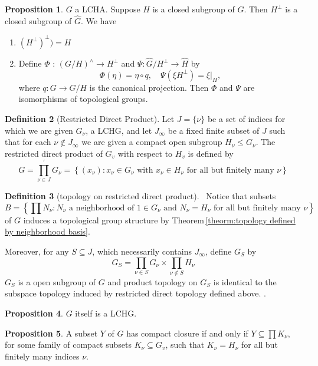 \documentclass[12pt,a4paper]{book}
\newenvironment{enu}{\begin{enumerate}[(1)]}{\end{enumerate}}
\theoremstyle{definition}
\newtheorem{defn}{Definition}[section]
\newtheorem{prop}[defn]{Proposition}
\begin{document}
\begin{prop}
    $G$ a LCHA. Suppose $H$ is a closed subgroup of $G$. Then $H^{\perp}$ is a closed subgroup of $\widehat{G}$. We have 
    \begin{enu}
    \item $(H^{\perp})^{\perp})=H$
    \item  Define $\Phi$ : $(G/H)^{\wedge} \rightarrow H^{\perp}$ and $\Psi: \widehat{G} / H^{\perp} \rightarrow \widehat{H}$ by
    $$
        \Phi(\eta)=\eta \circ q, \quad \Psi\left(\xi H^{\perp}\right)=\left.\xi\right|_H,
    $$
    where $q: G \rightarrow G / H$ is the canonical projection. Then $\Phi$ and $\Psi$ are isomorphisms of topological groups.
    \end{enu}
    \label{proposition: orthogonal complement, topological group}
\end{prop}
\begin{defn}[Restricted Direct Product]
    Let $J=\{\nu\}$ be a set of indices for which we are given $G_\nu$, a LCHG, 
    and let $J_{\infty}$ be a fixed finite subset of $J$ such that for each $\nu \notin J_{\infty}$ we are given a compact open subgroup $H_\nu \leq G_\nu$. 
    The restricted direct product of $G_v$
    with respect to $H_v$ is defined by
    $$
    G=\prod_{\nu \in J}^{\prime} G_\nu=\left\{\left(x_\nu\right): x_\nu \in G_\nu \text { with } x_\nu \in H_\nu \text { for all but finitely many } \nu\right\}
    $$
\end{defn}
\begin{defn}[topology on restricted direct product]\
Notice that subsets 
$$
B=\left\{\prod N_\nu: N_\nu \text { a neighborhood of } 1 \in G_\nu \text { and } N_\nu=H_\nu \text { for all but finitely many } \nu\right\}
$$
of $G$ induces a topological group structure by Theorem\,\ref{theorm:topology defined by neighborhood basis}.

Moreover, for any $S \subseteq J$, which necessarily contains $J_{\infty}$, define $G_S$ by
$$
G_S=\prod_{\nu \in S} G_\nu \times \prod_{\nu \notin S} H_\nu
$$
$G_S$ is a open subgroup of $G$ and product topology on $G_S$ is identical to the subspace topology induced 
by restricted direct topology defined above.    
\label{Definition: restricted direct product topology, subspace topology}.
\end{defn}
\begin{prop}
$G$ itself is a LCHG.
\end{prop}
\begin{prop}
    A subset $Y$ of $G$ has compact closure if and only if $Y \subseteq \prod K_\nu$, for some family of compact subsets $K_\nu \subseteq G_v$, such that $K_\nu=H_\nu$ for all but finitely many indices $\nu$.
    \label{proposition: compact subset in restricted direct product topology}
\end{prop}
\end{document}
